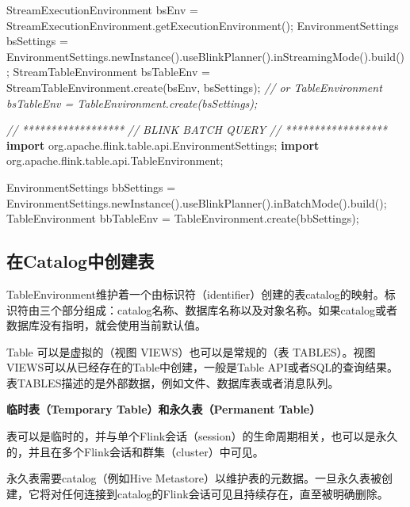 \documentclass[cn,11pt,chinese]{elegantbook}
\newenvironment{Shaded}{}{}
\newcommand{\CommentTok}[1]{\textcolor[rgb]{0.38,0.63,0.69}{\textit{#1}}}
\newcommand{\FunctionTok}[1]{\textcolor[rgb]{0.02,0.16,0.49}{#1}}
\newcommand{\ImportTok}[1]{#1}
\newcommand{\KeywordTok}[1]{\textcolor[rgb]{0.00,0.44,0.13}{\textbf{#1}}}
\newcommand{\NormalTok}[1]{#1}
\begin{document}
\begin{Shaded}
\begin{Highlighting}[]
\NormalTok{StreamExecutionEnvironment bsEnv = StreamExecutionEnvironment.}\FunctionTok{getExecutionEnvironment}\NormalTok{();}
\NormalTok{EnvironmentSettings bsSettings = EnvironmentSettings.}\FunctionTok{newInstance}\NormalTok{().}\FunctionTok{useBlinkPlanner}\NormalTok{().}\FunctionTok{inStreamingMode}\NormalTok{().}\FunctionTok{build}\NormalTok{();}
\NormalTok{StreamTableEnvironment bsTableEnv = StreamTableEnvironment.}\FunctionTok{create}\NormalTok{(bsEnv, bsSettings);}
\CommentTok{// or TableEnvironment bsTableEnv = TableEnvironment.create(bsSettings);}

\CommentTok{// ******************}
\CommentTok{// BLINK BATCH QUERY}
\CommentTok{// ******************}
\KeywordTok{import}\ImportTok{ org.apache.flink.table.api.EnvironmentSettings;}
\KeywordTok{import}\ImportTok{ org.apache.flink.table.api.TableEnvironment;}

\NormalTok{EnvironmentSettings bbSettings = EnvironmentSettings.}\FunctionTok{newInstance}\NormalTok{().}\FunctionTok{useBlinkPlanner}\NormalTok{().}\FunctionTok{inBatchMode}\NormalTok{().}\FunctionTok{build}\NormalTok{();}
\NormalTok{TableEnvironment bbTableEnv = TableEnvironment.}\FunctionTok{create}\NormalTok{(bbSettings);}
\end{Highlighting}
\end{Shaded}

\hypertarget{ux5728catalogux4e2dux521bux5efaux8868}{%
\subsection{在Catalog中创建表}\label{ux5728catalogux4e2dux521bux5efaux8868}}

TableEnvironment维护着一个由标识符（identifier）创建的表catalog的映射。标识符由三个部分组成：catalog名称、数据库名称以及对象名称。如果catalog或者数据库没有指明，就会使用当前默认值。

Table 可以是虚拟的（视图 VIEWS）也可以是常规的（表
TABLES）。视图VIEWS可以从已经存在的Table中创建，一般是Table
API或者SQL的查询结果。表TABLES描述的是外部数据，例如文件、数据库表或者消息队列。

\textbf{临时表（Temporary Table）和永久表（Permanent Table）}

表可以是临时的，并与单个Flink会话（session）的生命周期相关，也可以是永久的，并且在多个Flink会话和群集（cluster）中可见。

永久表需要catalog（例如Hive
Metastore）以维护表的元数据。一旦永久表被创建，它将对任何连接到catalog的Flink会话可见且持续存在，直至被明确删除。
\end{document}
